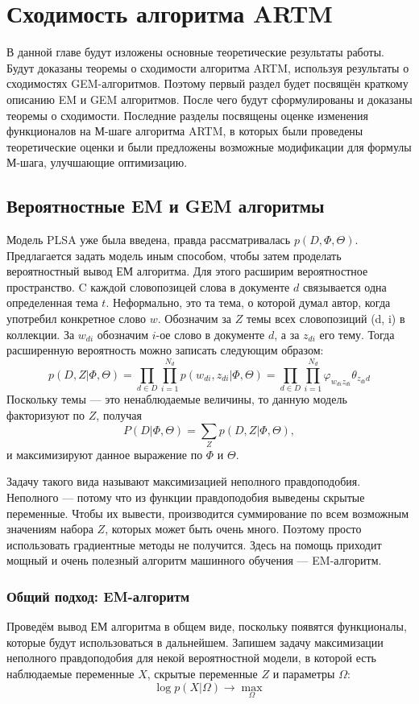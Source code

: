 \documentclass[12pt]{article}
\renewcommand{\phi}{\varphi}
\begin{document}
	\section{Сходимость алгоритма ARTM}
	В данной главе будут изложены основные теоретические результаты работы. Будут доказаны теоремы о сходимости алгоритма ARTM, используя результаты о сходимостях GEM-алгоритмов. Поэтому первый раздел будет посвящён краткому описанию EM и GEM алгоритмов. После чего будут сформулированы и доказаны теоремы о сходимости. Последние разделы посвящены оценке изменения функционалов на М-шаге алгоритма ARTM, в которых были проведены теоретические оценки и были предложены возможные модификации для формулы М-шага, улучшающие оптимизацию. 
	\subsection{Вероятностные EM и GEM алгоритмы}
Модель PLSA уже была введена, правда рассматривалась $p(D,\Phi,\Theta)$. Предлагается задать модель иным способом, чтобы затем проделать вероятностный вывод ЕМ алгоритма. Для этого расширим вероятностное пространство. C каждой словопозицей слова в документе $d$ связывается одна определенная тема $t$. Неформально, это та тема, о которой думал автор, когда употребил конкретное слово $w$. Обозначим за $Z$ темы всех словопозиций (d, i) в коллекции. За $w_{di}$ обозначим $i$-ое слово в документе $d$, а за $z_{di}$ его тему. Тогда расширенную вероятность можно записать следующим образом:
\[
p(D, Z|\Phi, \Theta) = \prod\limits_{d \in D} \prod\limits_{i=1}^{N_d} p(w_{di}, z_{di}|\Phi, \Theta) = \prod\limits_{d \in D} \prod\limits_{i=1}^{N_d} \phi_{w_{di}z_{di}}\theta_{z_{di}d}
\]
Поскольку темы --- это ненаблюдаемые величины, то данную модель факторизуют по $Z$, получая
\[
P(D|\Phi,\Theta ) = \sum\limits_Z p(D, Z|\Phi, \Theta),
\]
и максимизируют данное выражение по $\Phi$ и $\Theta$.

Задачу такого вида называют максимизацией неполного правдоподобия. Неполного ---  потому что из функции правдоподобия выведены скрытые переменные. Чтобы их вывести, производится суммирование по всем возможным значениям набора $Z$, которых может быть очень много. Поэтому просто использовать градиентные методы не получится. Здесь на помощь приходит мощный и очень полезный алгоритм машинного обучения --- EM-алгоритм.
	\subsubsection{Общий подход: EM-алгоритм}
	Проведём вывод ЕМ алгоритма в общем виде, поскольку появятся функционалы, которые будут использоваться в дальнейшем. Запишем задачу максимизации неполного правдоподобия для некой вероятностной модели, в которой есть наблюдаемые переменные $X$, скрытые переменные $Z$ и параметры $\Omega$:
\[
\log p(X|\Omega) \to \max\limits_{\Omega}
\]
\end{document}
